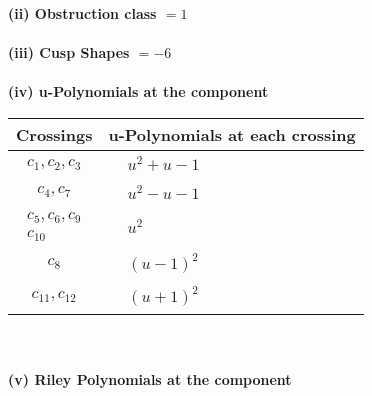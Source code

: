 \documentclass[1p]{elsarticle_modified}
\theoremstyle{definition}
\begin{document}
\flushleft \textbf{(ii) Obstruction class $= 1$}\\~\\
\flushleft \textbf{(iii) Cusp Shapes $= -6$}\\~\\
\newpage\renewcommand{\arraystretch}{1}
\flushleft \textbf{(iv) u-Polynomials at the component}\newline \\
\begin{tabular}{m{50pt}|m{274pt}}
Crossings & \hspace{64pt}u-Polynomials at each crossing \\
\hline $$\begin{aligned}c_{1},c_{2},c_{3}\end{aligned}$$&$\begin{aligned}
&u^2+u-1
\end{aligned}$\\
\hline $$\begin{aligned}c_{4},c_{7}\end{aligned}$$&$\begin{aligned}
&u^2- u-1
\end{aligned}$\\
\hline $$\begin{aligned}c_{5},c_{6},c_{9}\\c_{10}\end{aligned}$$&$\begin{aligned}
&u^2
\end{aligned}$\\
\hline $$\begin{aligned}c_{8}\end{aligned}$$&$\begin{aligned}
&(u-1)^2
\end{aligned}$\\
\hline $$\begin{aligned}c_{11},c_{12}\end{aligned}$$&$\begin{aligned}
&(u+1)^2
\end{aligned}$\\
\hline
\end{tabular}\\~\\
\newpage\renewcommand{\arraystretch}{1}
\flushleft \textbf{(v) Riley Polynomials at the component}\newline \\
\end{document}
